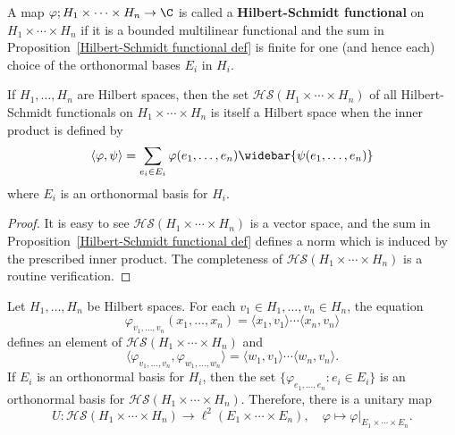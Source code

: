 A map $\varphi;H_1\times\cdots\times H_n\to\C$ is called a \textbf{Hilbert-Schmidt functional} on $H_1\times\cdots\times H_n$ if it is a bounded multilinear functional and the sum in Proposition~\ref{Hilbert-Schmidt functional def} is finite for one (and hence each) choice of the orthonormal bases $E_i$ in $H_i$.
\begin{proposition}\label{Hilbert-Schmidt functional is Hilbert space}
If $H_1,\dots,H_n$ are Hilbert spaces, then the set $\mathcal{HS}(H_1\times\cdots\times H_n)$ of all Hilbert-Schmidt functionals on $H_1\times\cdots\times H_n$ is itself a Hilbert space when the inner product is defined by
\[\langle\varphi,\psi\rangle=\sum_{e_i\in E_i}\varphi(e_1,\dots,e_n)\widebar{\psi(e_1,\dots,e_n)}\]
where $E_i$ is an orthonormal basis for $H_i$.
\end{proposition}
\begin{proof}
It is easy to see $\mathcal{HS}(H_1\times\cdots\times H_n)$ is a vector space, and the sum in Proposition~\ref{Hilbert-Schmidt functional def} defines a norm which is induced by the prescribed inner product. The completeness of $\mathcal{HS}(H_1\times\cdots\times H_n)$ is a routine verification.
\end{proof}
\begin{proposition}\label{Hilbert-Schmidt functional orthonormal basis}
Let $H_1,\dots,H_n$ be Hilbert spaces. For each $v_1\in H_1,\dots,v_n\in H_n$, the equation
\[\varphi_{v_1,\dots,v_n}(x_1,\dots,x_n)=\langle x_1,v_1\rangle\cdots\langle x_n,v_n\rangle\]
defines an element of $\mathcal{HS}(H_1\times\cdots\times H_n)$ and
\[\langle\varphi_{v_1,\dots,v_n},\varphi_{w_1,\dots,w_n}\rangle=\langle w_1,v_1\rangle\cdots\langle w_n,v_n\rangle.\]
If $E_i$ is an orthonormal basis for $H_i$, then the set $\{\varphi_{e_1,\dots,e_n}:e_i\in E_i\}$ is an orthonormal basis for $\mathcal{HS}(H_1\times\cdots\times H_n)$. Therefore, there is a unitary map
\[U:\mathcal{HS}(H_1\times\cdots\times H_n)\to\ell^2(E_1\times\cdots\times E_n),\quad\varphi\mapsto\varphi|_{E_1\times\cdots\times E_n}.\]
\end{proposition}
